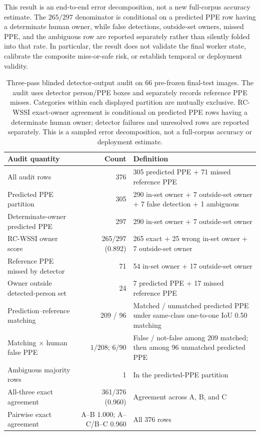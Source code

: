 \documentclass[iicol,pdflatex,sn-mathphys-num]{sn-jnl}
\begin{document}
This result is an end-to-end error decomposition, not a new full-corpus accuracy estimate. The $265/297$ denominator is conditional on a predicted PPE row having a determinate human owner, while false detections, outside-set owners, missed PPE, and the ambiguous row are reported separately rather than silently folded into that rate. In particular, the result does not validate the final worker state, calibrate the composite miss-or-safe risk, or establish temporal or deployment validity.

\begin{table}[t]
\caption{Three-pass blinded detector-output audit on 66 pre-frozen final-test images. The audit uses detector person/PPE boxes and separately records reference PPE misses. Categories within each displayed partition are mutually exclusive. RC-WSSI exact-owner agreement is conditional on predicted PPE rows having a determinate human owner; detector failures and unresolved rows are reported separately. This is a sampled error decomposition, not a full-corpus accuracy or deployment estimate.}
\label{tab:endtoendaudit}
\centering
\scriptsize
\setlength{\tabcolsep}{4pt}
\begin{tabular}{@{}p{} r p{}@{}}
\toprule
Audit quantity & Count & Definition \\
\midrule
All audit rows & 376 & 305 predicted PPE + 71 missed reference PPE \\
Predicted PPE partition & 305 & 290 in-set owner + 7 outside-set owner + 7 false detection + 1 ambiguous \\
Determinate-owner predicted PPE & 297 & 290 in-set owner + 7 outside-set owner \\
RC-WSSI owner score & 265/297 (0.892) & 265 exact + 25 wrong in-set owner + 7 outside-set owner \\
Reference PPE missed by detector & 71 & 54 in-set owner + 17 outside-set owner \\
Owner outside detected-person set & 24 & 7 predicted PPE + 17 missed reference PPE \\
Prediction--reference matching & 209 / 96 & Matched / unmatched predicted PPE under same-class one-to-one IoU 0.50 matching \\
Matching $\times$ human false PPE & $1/208$; $6/90$ & False / not-false among 209 matched; then among 96 unmatched predicted PPE \\
Ambiguous majority rows & 1 & In the predicted-PPE partition \\
All-three exact agreement & 361/376 (0.960) & Agreement across A, B, and C \\
Pairwise exact agreement & A--B 1.000; A--C/B--C 0.960 & All 376 rows \\
\bottomrule
\end{tabular}
\end{table}
\end{document}
